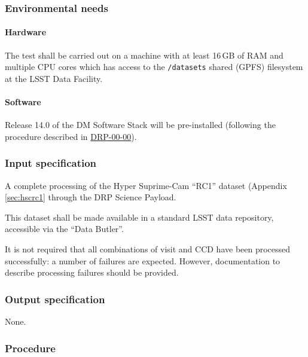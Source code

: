 \subsubsection{Environmental needs}

\paragraph{Hardware}

The test shall be carried out on a machine with at least 16\,GB of RAM and
multiple CPU cores which has access to the \texttt{/datasets} shared (GPFS)
filesystem at the LSST Data Facility.

\paragraph{Software}

Release 14.0 of the DM Software Stack will be pre-installed (following the
procedure described in \hyperref[drp-00-00]{DRP-00-00}).

\subsubsection{Input specification}

A complete processing of the Hyper Suprime-Cam ``RC1'' dataset (Appendix
\ref{sec:hscrc1} through the DRP Science Payload.

This dataset shall be made available in a standard LSST data repository,
accessible via the ``Data Butler''.

It is not required that all combinations of visit and CCD have been processed
successfully: a number of failures are expected. However, documentation to
describe processing failures should be provided.

\subsubsection{Output specification}

None.

\subsubsection{Procedure}

